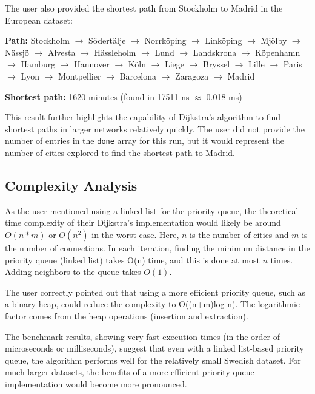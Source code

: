 \documentclass[a4paper,11pt]{article}
\begin{document}
The user also provided the shortest path from Stockholm to Madrid in the European dataset:

\textbf{Path:} Stockholm $\rightarrow$ Södertälje $\rightarrow$ Norrköping $\rightarrow$ Linköping $\rightarrow$ Mjölby $\rightarrow$ Nässjö $\rightarrow$ Alvesta $\rightarrow$ Hässleholm $\rightarrow$ Lund $\rightarrow$ Landskrona $\rightarrow$ Köpenhamn $\rightarrow$ Hamburg $\rightarrow$ Hannover $\rightarrow$ Köln $\rightarrow$ Liege $\rightarrow$ Bryssel $\rightarrow$ Lille $\rightarrow$ Paris $\rightarrow$ Lyon $\rightarrow$ Montpellier $\rightarrow$ Barcelona $\rightarrow$ Zaragoza $\rightarrow$ Madrid

\textbf{Shortest path:} 1620 minutes (found in 17511 ns $\approx$ 0.018 ms)

This result further highlights the capability of Dijkstra's algorithm to find shortest paths in larger networks relatively quickly. The user did not provide the number of entries in the \texttt{done} array for this run, but it would represent the number of cities explored to find the shortest path to Madrid.

\subsection*{Complexity Analysis}
As the user mentioned using a linked list for the priority queue, the theoretical time complexity of their Dijkstra's implementation would likely be around $O(n*m)$ or $O(n^2)$ in the worst case. Here, $n$ is the number of cities and $m$ is the number of connections. In each iteration, finding the minimum distance in the priority queue (linked list) takes O(n) time, and this is done at most $n$ times. Adding neighbors to the queue takes $O(1)$.

The user correctly pointed out that using a more efficient priority queue, such as a binary heap, could reduce the complexity to O((n+m)log n). The logarithmic factor comes from the heap operations (insertion and extraction).

The benchmark results, showing very fast execution times (in the order of microseconds or milliseconds), suggest that even with a linked list-based priority queue, the algorithm performs well for the relatively small Swedish dataset. For much larger datasets, the benefits of a more efficient priority queue implementation would become more pronounced.
\end{document}
